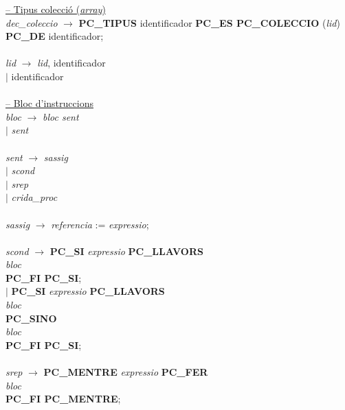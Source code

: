 \documentclass[10pt]{report}
\begin{document}
\begin{tabbing}
        \underline{-- Tipus colecció (\textit{array})} \\
        \textit{dec\_coleccio} \> $\rightarrow$ \> \textbf{PC\_TIPUS} identificador \textbf{PC\_ES PC\_COLECCIO} (\textit{lid}) \textbf{PC\_DE} identificador; \\
        \\
        \textit{lid} \> $\rightarrow$ \> \textit{lid}, identificador \\
        \> $\mid$ \> identificador \\
        \\
        
        
        \underline{-- Bloc d'instruccions} \\
        \textit{bloc} \> $\rightarrow$ \> \textit{bloc sent} \\
        \> $\mid$ \> \textit{sent} \\
        \\
        \textit{sent} \> $\rightarrow$ \> \textit{sassig} \\
        \> $\mid$ \> \textit{scond} \\
        \> $\mid$ \> \textit{srep} \\
        \> $\mid$ \> \textit{crida\_proc} \\
        \\
        
        \textit{sassig} \> $\rightarrow$ \> \textit{referencia} := \textit{expressio}; \\
        \\
        
        \textit{scond} \> $\rightarrow$ \> \textbf{PC\_SI} \textit{expressio} \textbf{PC\_LLAVORS} \\
        \> \> \>  \textit{bloc} \\
        \> \> \textbf{PC\_FI PC\_SI}; \\
        \> $\mid$ \> \textbf{PC\_SI} \textit{expressio} \textbf{PC\_LLAVORS} \\
        \> \> \> \textit{bloc} \\
        \> \> \textbf{PC\_SINO} \\
        \> \> \> \textit{bloc} \\
        \> \> \textbf{PC\_FI PC\_SI}; \\
        \\
        
        \textit{srep} \> $\rightarrow$ \> \textbf{PC\_MENTRE} \textit{expressio} \textbf{PC\_FER} \\
        \> \> \> \textit{bloc} \\
        \> \> \textbf{PC\_FI PC\_MENTRE}; \\
        \\
        

\end{tabbing}
\end{document}
